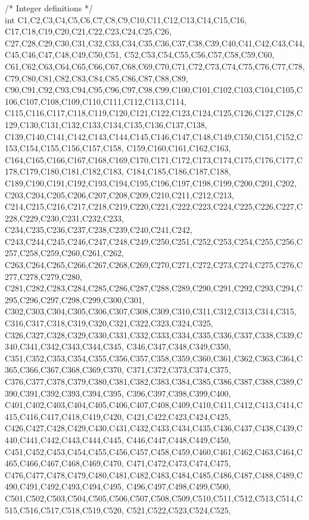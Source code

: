 /* Integer definitions */ \\
int C1,C2,C3,C4,C5,C6,C7,C8,C9,C10,C11,C12,C13,C14,C15,C16, C17,C18,C19,C20,C21,C22,C23,C24,C25,C26, C27,C28,C29,C30,C31,C32,C33,C34,C35,C36,C37,C38,C39,C40,C41,C42,C43,C44,C45,C46,C47,C48,C49,C50,C51, C52,C53,C54,C55,C56,C57,C58,C59,C60, C61,C62,C63,C64,C65,C66,C67,C68,C69,C70,C71,C72,C73,C74,C75,C76,C77,C78,C79,C80,C81,C82,C83,C84,C85,C86,C87,C88,C89,
C90,C91,C92,C93,C94,C95,C96,C97,C98,C99,C100,C101,C102,C103,C104,C105,C106,C107,C108,C109,C110,C111,C112,C113,C114,
C115,C116,C117,C118,C119,C120,C121,C122,C123,C124,C125,C126,C127,C128,C129,C130,C131,C132,C133,C134,C135,C136,C137,C138,
C139,C140,C141,C142,C143,C144,C145,C146,C147,C148,C149,C150,C151,C152,C153,C154,C155,C156,C157,C158, C159,C160,C161,C162,C163,
C164,C165,C166,C167,C168,C169,C170,C171,C172,C173,C174,C175,C176,C177,C178,C179,C180,C181,C182,C183, C184,C185,C186,C187,C188,
C189,C190,C191,C192,C193,C194,C195,C196,C197,C198,C199,C200,C201,C202, C203,C204,C205,C206,C207,C208,C209,C210,C211,C212,C213,
C214,C215,C216,C217,C218,C219,C220,C221,C222,C223,C224,C225,C226,C227,C228,C229,C230,C231,C232,C233, C234,C235,C236,C237,C238,C239,C240,C241,C242,
C243,C244,C245,C246,C247,C248,C249,C250,C251,C252,C253,C254,C255,C256,C257,C258,C259,C260,C261,C262, C263,C264,C265,C266,C267,C268,C269,C270,C271,C272,C273,C274,C275,C276,C277,C278,C279,C280, C281,C282,C283,C284,C285,C286,C287,C288,C289,C290,C291,C292,C293,C294,C295,C296,C297,C298,C299,C300,C301,
C302,C303,C304,C305,C306,C307,C308,C309,C310,C311,C312,C313,C314,C315, C316,C317,C318,C319,C320,C321,C322,C323,C324,C325,
C326,C327,C328,C329,C330,C331,C332,C333,C334,C335,C336,C337,C338,C339,C340,C341,C342,C343,C344,C345, C346,C347,C348,C349,C350,
C351,C352,C353,C354,C355,C356,C357,C358,C359,C360,C361,C362,C363,C364,C365,C366,C367,C368,C369,C370, C371,C372,C373,C374,C375,
C376,C377,C378,C379,C380,C381,C382,C383,C384,C385,C386,C387,C388,C389,C390,C391,C392,C393,C394,C395, C396,C397,C398,C399,C400,
C401,C402,C403,C404,C405,C406,C407,C408,C409,C410,C411,C412,C413,C414,C415,C416,C417,C418,C419,C420, C421,C422,C423,C424,C425,
C426,C427,C428,C429,C430,C431,C432,C433,C434,C435,C436,C437,C438,C439,C440,C441,C442,C443,C444,C445, C446,C447,C448,C449,C450,
C451,C452,C453,C454,C455,C456,C457,C458,C459,C460,C461,C462,C463,C464,C465,C466,C467,C468,C469,C470, C471,C472,C473,C474,C475,
C476,C477,C478,C479,C480,C481,C482,C483,C484,C485,C486,C487,C488,C489,C490,C491,C492,C493,C494,C495, C496,C497,C498,C499,C500,
C501,C502,C503,C504,C505,C506,C507,C508,C509,C510,C511,C512,C513,C514,C515,C516,C517,C518,C519,C520, C521,C522,C523,C524,C525,
